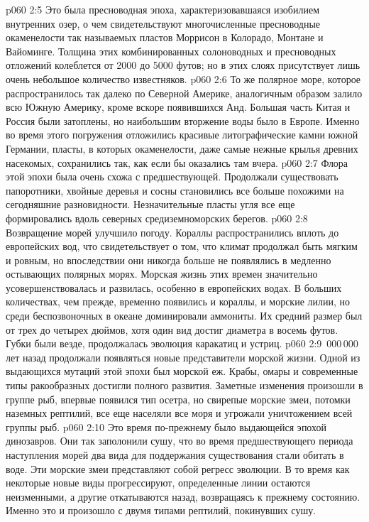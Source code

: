 \vs p060 2:5 Это была пресноводная эпоха, характеризовавшаяся изобилием внутренних озер, о чем свидетельствуют многочисленные пресноводные окаменелости так называемых пластов Моррисон в Колорадо, Монтане и Вайоминге. Толщина этих комбинированных солоноводных и пресноводных отложений колеблется от 2000 до 5000 футов; но в этих слоях присутствует лишь очень небольшое количество известняков.
\vs p060 2:6 То же полярное море, которое распространилось так далеко по Северной Америке, аналогичным образом залило всю Южную Америку, кроме вскоре появившихся Анд. Большая часть Китая и Россия были затоплены, но наибольшим вторжение воды было в Европе. Именно во время этого погружения отложились красивые литографические камни южной Германии, пласты, в которых окаменелости, даже самые нежные крылья древних насекомых, сохранились так, как если бы оказались там вчера.
\vs p060 2:7 Флора этой эпохи была очень схожа с предшествующей. Продолжали существовать папоротники, хвойные деревья и сосны становились все больше похожими на сегодняшние разновидности. Незначительные пласты угля все еще формировались вдоль северных средиземноморских берегов.
\vs p060 2:8 Возвращение морей улучшило погоду. Кораллы распространились вплоть до европейских вод, что свидетельствует о том, что климат продолжал быть мягким и ровным, но впоследствии они никогда больше не появлялись в медленно остывающих полярных морях. Морская жизнь этих времен значительно усовершенствовалась и развилась, особенно в европейских водах. В больших количествах, чем прежде, временно появились и кораллы, и морские лилии, но среди беспозвоночных в океане доминировали аммониты. Их средний размер был от трех до четырех дюймов, хотя один вид достиг диаметра в восемь футов. Губки были везде, продолжалась эволюция каракатиц и устриц.
\vs p060 2:9 \,000\,000 лет назад продолжали появляться новые представители морской жизни. Одной из выдающихся мутаций этой эпохи был морской еж. Крабы, омары и современные типы ракообразных достигли полного развития. Заметные изменения произошли в группе рыб, впервые появился тип осетра, но свирепые морские змеи, потомки наземных рептилий, все еще населяли все моря и угрожали уничтожением всей группы рыб.
\vs p060 2:10 Это время по\hyp{}прежнему было выдающейся эпохой динозавров. Они так заполонили сушу, что во время предшествующего периода наступления морей два вида для поддержания существования стали обитать в воде. Эти морские змеи представляют собой регресс эволюции. В то время как некоторые новые виды прогрессируют, определенные линии остаются неизменными, а другие откатываются назад, возвращаясь к прежнему состоянию. Именно это и произошло с двумя типами рептилий, покинувших сушу.
